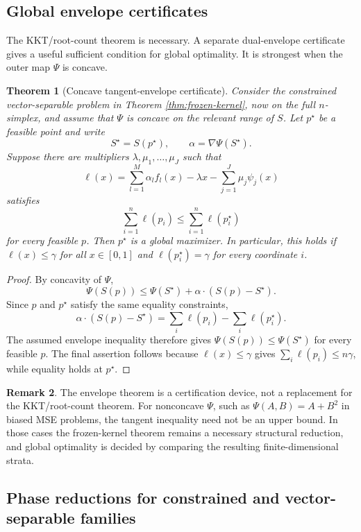 \documentclass[11pt]{article}
\newtheorem{theorem}{Theorem}[section]
\theoremstyle{definition}
\newtheorem{remark}[theorem]{Remark}
\begin{document}
\subsection{Global envelope certificates}\label{subsec:global-envelope}

The KKT/root-count theorem is necessary.  A separate dual-envelope certificate gives a useful sufficient condition for global optimality.  It is strongest when the outer map $\Psi$ is concave.

\begin{theorem}[Concave tangent-envelope certificate]\label{thm:concave-envelope}
Consider the constrained vector-separable problem in Theorem \ref{thm:frozen-kernel}, now on the full $n$-simplex, and assume that $\Psi$ is concave on the relevant range of $S$.  Let $p^\star$ be a feasible point and write
\[
  S^\star=S(p^\star),\qquad \alpha=\nabla\Psi(S^\star).
\]
Suppose there are multipliers $\lambda,\mu_1,\ldots,\mu_J$ such that
\[
  \ell(x)=\sum_{l=1}^M\alpha_l f_l(x)-\lambda x-
       \sum_{j=1}^J\mu_j\psi_j(x)
\]
satisfies
\[
  \sum_{i=1}^n \ell(p_i)\le \sum_{i=1}^n \ell(p_i^\star)
\]
for every feasible $p$.  Then $p^\star$ is a global maximizer.  In particular, this holds if $\ell(x)\le \gamma$ for all $x\in[0,1]$ and $\ell(p_i^\star)=\gamma$ for every coordinate $i$.
\end{theorem}

\begin{proof}
By concavity of $\Psi$,
\[
  \Psi(S(p))\le \Psi(S^\star)+\alpha\cdot(S(p)-S^\star).
\]
Since $p$ and $p^\star$ satisfy the same equality constraints,
\[
  \alpha\cdot(S(p)-S^\star)
  =\sum_i \ell(p_i)-\sum_i \ell(p_i^\star).
\]
The assumed envelope inequality therefore gives $\Psi(S(p))\le\Psi(S^\star)$ for every feasible $p$.  The final assertion follows because $\ell(x)\le\gamma$ gives $\sum_i\ell(p_i)\le n\gamma$, while equality holds at $p^\star$.
\end{proof}

\begin{remark}
The envelope theorem is a certification device, not a replacement for the KKT/root-count theorem.  For nonconcave $\Psi$, such as $\Psi(A,B)=A+B^2$ in biased MSE problems, the tangent inequality need not be an upper bound.  In those cases the frozen-kernel theorem remains a necessary structural reduction, and global optimality is decided by comparing the resulting finite-dimensional strata.
\end{remark}

\subsection{Phase reductions for constrained and vector-separable families}\label{subsec:phase-reductions}
\end{document}
